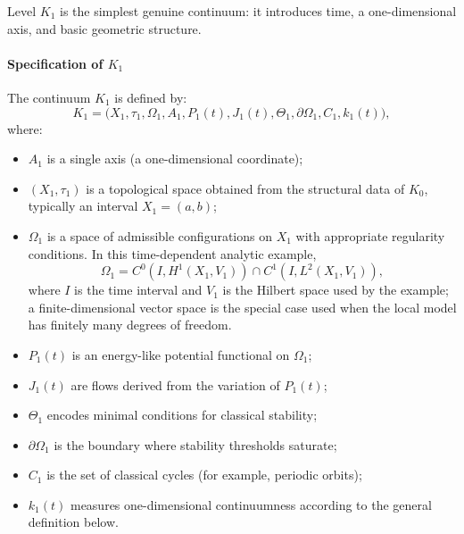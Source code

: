 Level \(K_1\) is the simplest genuine continuum: it introduces time, a one-dimensional axis, and basic geometric structure.

\paragraph{Specification of \texorpdfstring{\(K_1\)}{K\_1}}
The continuum \(K_1\) is defined by:
\[
    K_1 = \big(X_1,\tau_1,\Omega_1,A_1,P_1(t),J_1(t),\Theta_1,\partial\Omega_1,C_1,k_1(t)\big),
\]
where:
\begin{itemize}
    \item \(A_1\) is a single axis (a one-dimensional coordinate);
    \item \((X_1,\tau_1)\) is a topological space obtained from the structural data of \(K_0\), typically an interval \(X_1 = (a,b)\);
    \item \(\Omega_1\) is a space of admissible configurations on \(X_1\) with appropriate regularity conditions.
          In this time-dependent analytic example,
          \[
              \Omega_1 = C^0(I,H^1(X_1,V_1)) \cap C^1(I,L^2(X_1,V_1)),
          \]
          where \(I\) is the time interval and \(V_1\) is the Hilbert space
          used by the example; a finite-dimensional vector space is the
          special case used when the local model has finitely many degrees of
          freedom.
    \item \(P_1(t)\) is an energy-like potential functional on \(\Omega_1\);
    \item \(J_1(t)\) are flows derived from the variation of \(P_1(t)\);
    \item \(\Theta_1\) encodes minimal conditions for classical stability;
    \item \(\partial\Omega_1\) is the boundary where stability thresholds saturate;
    \item \(C_1\) is the set of classical cycles (for example, periodic orbits);
    \item \(k_1(t)\) measures one-dimensional continuumness according to the general definition below.
\end{itemize}

